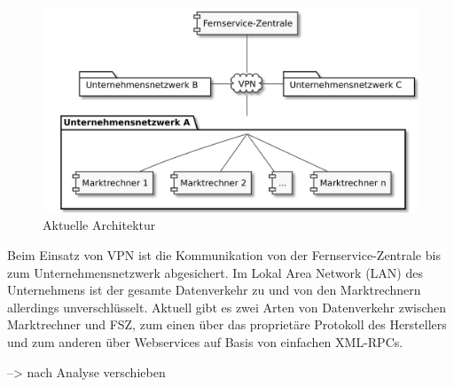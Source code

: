 \documentclass[11pt,a4paper]{report}
\begin{document}

\begin{figure}[htbp]
\centering
\includegraphics[scale=0.19]{images/problemfeld.pdf}
\caption{Aktuelle Architektur}
\label{fig:current_setup}
\end{figure}

Beim Einsatz von VPN ist die Kommunikation von der Fernservice-Zentrale bis zum Unternehmensnetzwerk abgesichert. Im Lokal Area Network (LAN) des Unternehmens ist der gesamte Datenverkehr zu und von den Marktrechnern allerdings unverschlüsselt. Aktuell gibt es zwei Arten von Datenverkehr zwischen Marktrechner und FSZ, zum einen über das proprietäre Protokoll des Herstellers und zum anderen über Webservices auf Basis von einfachen XML-RPCs.

--> nach Analyse verschieben
\end{document}
